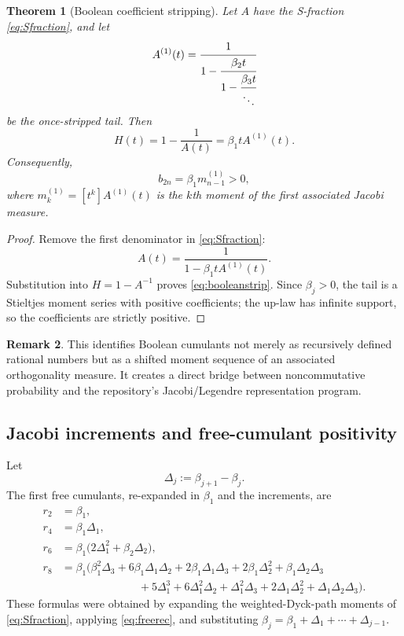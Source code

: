 \documentclass[11pt]{article}
\newtheorem{theorem}{Theorem}[section]
\theoremstyle{definition}
\newtheorem{remark}[theorem]{Remark}
\begin{document}
\begin{theorem}[Boolean coefficient stripping]\label{thm:booleanstrip}
Let \(A\) have the S-fraction \eqref{eq:Sfraction}, and let
\[
A^{(1)}(t)=
\cfrac{1}{1-\cfrac{\beta_2t}{1-\cfrac{\beta_3t}{\ddots}}}
\]
be the once-stripped tail. Then
\begin{equation}\label{eq:booleanstrip}
H(t)=1-\frac1{A(t)}=\beta_1tA^{(1)}(t).
\end{equation}
Consequently,
\begin{equation}\label{eq:booleanassociated}
b_{2n}=\beta_1m_{n-1}^{(1)}>0,
\end{equation}
where \(m_k^{(1)}=[t^k]A^{(1)}(t)\) is the \(k\)th moment of the first associated Jacobi measure.
\end{theorem}
\begin{proof}
Remove the first denominator in \eqref{eq:Sfraction}:
\[
A(t)=\frac1{1-\beta_1tA^{(1)}(t)}.
\]
Substitution into \(H=1-A^{-1}\) proves \eqref{eq:booleanstrip}. Since \(\beta_j>0\), the tail is a Stieltjes moment series with positive coefficients; the up-law has infinite support, so the coefficients are strictly positive.
\end{proof}

\begin{remark}
This identifies Boolean cumulants not merely as recursively defined rational numbers but as a shifted moment sequence of an associated orthogonality measure. It creates a direct bridge between noncommutative probability and the repository's Jacobi/Legendre representation program.
\end{remark}

\subsection{Jacobi increments and free-cumulant positivity}
Let
\begin{equation}\label{eq:deltabeta}
\Delta_j:=\beta_{j+1}-\beta_j.
\end{equation}
The first free cumulants, re-expanded in \(\beta_1\) and the increments, are
\begin{align}
r_2&=\beta_1,\label{eq:r2beta}\\
r_4&=\beta_1\Delta_1,\label{eq:r4beta}\\
r_6&=\beta_1\bigl(2\Delta_1^2+\beta_2\Delta_2\bigr),\label{eq:r6beta}\\
r_8&=\beta_1\bigl(
\beta_1^2\Delta_3+6\beta_1\Delta_1\Delta_2
+2\beta_1\Delta_1\Delta_3+2\beta_1\Delta_2^2
+\beta_1\Delta_2\Delta_3\nonumber\\
&\hspace{7em}+5\Delta_1^3+6\Delta_1^2\Delta_2
+\Delta_1^2\Delta_3+2\Delta_1\Delta_2^2
+\Delta_1\Delta_2\Delta_3\bigr).
\label{eq:r8beta}
\end{align}
These formulas were obtained by expanding the weighted-Dyck-path moments of \eqref{eq:Sfraction}, applying \eqref{eq:freerec}, and substituting \(\beta_j=\beta_1+\Delta_1+\cdots+\Delta_{j-1}\).
\end{document}
